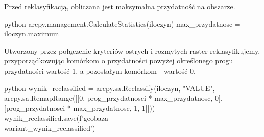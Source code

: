 \documentclass{article}
\begin{document}
Przed reklasyfikacją, obliczana jest maksymalna przydatność na obszarze.
\vspace{5pt}

\begin{mintedbox}{python}
arcpy.management.CalculateStatistics(iloczyn)
max_przydatnosc = iloczyn.maximum
\end{mintedbox}
\vspace{10pt}

Utworzony przez połączenie kryteriów ostrych i rozmytych raster reklasyfikujemy, przyporządkowując komórkom o przydatności powyżej określonego progu przydatności wartość 1, a pozostałym komórkom - wartość 0.
\vspace{5pt}

\begin{mintedbox}{python}
wynik_reclassified = arcpy.sa.Reclassify(iloczyn, "VALUE", arcpy.sa.RemapRange([[0, prog_przydatnosci * max_przydatnosc, 0], [prog_przydatnosci * max_przydatnosc, 1, 1]]))
wynik_reclassified.save(f'{geobaza}\\{wariant}_wynik_reclassified')
\end{mintedbox}
\vspace{5pt}
\end{document}
